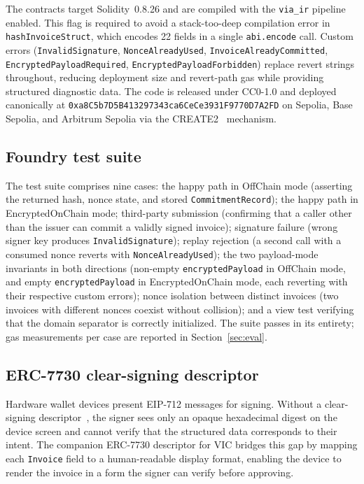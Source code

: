\documentclass[11pt,a4paper]{article}
\begin{document}
The contracts target Solidity~0.8.26 and are compiled with the \texttt{via\_ir} pipeline enabled. This flag is required to avoid a stack-too-deep compilation error in \texttt{hashInvoiceStruct}, which encodes 22 fields in a single \texttt{abi.encode} call. Custom errors (\texttt{InvalidSignature}, \texttt{NonceAlreadyUsed}, \texttt{InvoiceAlreadyCommitted}, \texttt{EncryptedPayloadRequired}, \texttt{EncryptedPayloadForbidden}) replace revert strings throughout, reducing deployment size and revert-path gas while providing structured diagnostic data. The code is released under CC0-1.0 and deployed canonically at \texttt{0xa8C5b7D5B413297343ca6CeCe3931F9770D7A2FD} on Sepolia, Base Sepolia, and Arbitrum Sepolia via the CREATE2~\cite{create2} mechanism.

\subsection{Foundry test suite}

The test suite comprises nine cases: the happy path in OffChain mode (asserting the returned hash, nonce state, and stored \texttt{CommitmentRecord}); the happy path in EncryptedOnChain mode; third-party submission (confirming that a caller other than the issuer can commit a validly signed invoice); signature failure (wrong signer key produces \texttt{InvalidSignature}); replay rejection (a second call with a consumed nonce reverts with \texttt{NonceAlreadyUsed}); the two payload-mode invariants in both directions (non-empty \texttt{encryptedPayload} in OffChain mode, and empty \texttt{encryptedPayload} in EncryptedOnChain mode, each reverting with their respective custom errors); nonce isolation between distinct invoices (two invoices with different nonces coexist without collision); and a view test verifying that the domain separator is correctly initialized. The suite passes in its entirety; gas measurements per case are reported in Section~\ref{sec:eval}.

\subsection{ERC-7730 clear-signing descriptor}

Hardware wallet devices present EIP-712 messages for signing. Without a clear-signing descriptor~\cite{erc7730}, the signer sees only an opaque hexadecimal digest on the device screen and cannot verify that the structured data corresponds to their intent. The companion ERC-7730 descriptor for VIC bridges this gap by mapping each \texttt{Invoice} field to a human-readable display format, enabling the device to render the invoice in a form the signer can verify before approving.
\end{document}

